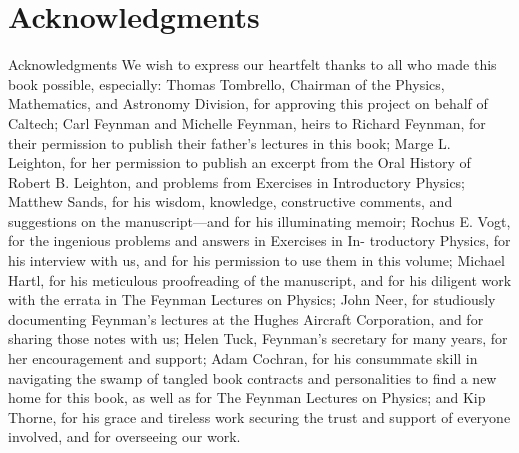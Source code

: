 \documentclass[10pt,oneside]{article}
\begin{document}
\section*{Acknowledgments}
\label{tips-sec-4-acknowledgments}
Acknowledgments We wish to express our heartfelt thanks to all who made this book possible, especially: Thomas Tombrello, Chairman of the Physics, Mathematics, and Astronomy Division, for approving this project on behalf of Caltech; Carl Feynman and Michelle Feynman, heirs to Richard Feynman, for their permission to publish their father’s lectures in this book; Marge L. Leighton, for her permission to publish an excerpt from the Oral History of Robert B. Leighton, and problems from Exercises in Introductory Physics; Matthew Sands, for his wisdom, knowledge, constructive comments, and suggestions on the manuscript---and for his illuminating memoir; Rochus E. Vogt, for the ingenious problems and answers in Exercises in In- troductory Physics, for his interview with us, and for his permission to use them in this volume; Michael Hartl, for his meticulous proofreading of the manuscript, and for his diligent work with the errata in The Feynman Lectures on Physics; John Neer, for studiously documenting Feynman’s lectures at the Hughes Aircraft Corporation, and for sharing those notes with us; Helen Tuck, Feynman’s secretary for many years, for her encouragement and support; Adam Cochran, for his consummate skill in navigating the swamp of tangled book contracts and personalities to find a new home for this book, as well as for The Feynman Lectures on Physics; and Kip Thorne, for his grace and tireless work securing the trust and support of everyone involved, and for overseeing our work.\par

\clearpage
{}
\end{document}
